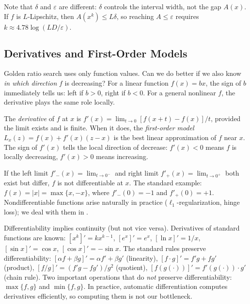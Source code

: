 Note that $\delta$ and $\varepsilon$ are different: $\delta$ controls the interval width, not the gap $A(x)$.
If $f$ is $L$-Lipschitz, then $A(x^k) \leq L\delta$, so reaching $A \leq \varepsilon$ requires $k \approx 4.78 \log(LD / \varepsilon)$.


\subsection{Derivatives and First-Order Models}\label{ssec:derivatives}

Golden ratio search uses only function values.
Can we do better if we also know \emph{in which direction} $f$ is decreasing?
For a linear function $f(x) = bx$, the sign of $b$ immediately tells us: left if $b > 0$, right if $b < 0$.
For a general nonlinear $f$, the derivative plays the same role locally.

\begin{defn}\label{def:derivative}
	The \textit{derivative} of $f$ at $x$ is $f'(x) = \lim_{t \to 0} [f(x + t) - f(x)] / t$, provided the limit exists and is finite.
	When it does, the \textit{first-order model} $L_x(z) = f(x) + f'(x)(z - x)$ is the best linear approximation of $f$ near $x$.
	The sign of $f'(x)$ tells the local direction of decrease: $f'(x) < 0$ means $f$ is locally decreasing, $f'(x) > 0$ means increasing.
\end{defn}

If the left limit $f'_-(x) = \lim_{t \to 0^-}$ and right limit $f'_+(x) = \lim_{t \to 0^+}$ both exist but differ, $f$ is not differentiable at $x$.
The standard example: $f(x) = |x| = \max\{x, -x\}$, where $f'_-(0) = -1$ and $f'_+(0) = +1$.
Nondifferentiable functions arise naturally in practice ($\ell_1$-regularization, hinge loss); we deal with them in .

Differentiability implies continuity (but not vice versa).
Derivatives of standard functions are known: $[x^k]' = kx^{k-1}$, $[e^x]' = e^x$, $[\ln x]' = 1/x$, $[\sin x]' = \cos x$, $[\cos x]' = -\sin x$.
The standard rules preserve differentiability:
$[\alpha f + \beta g]' = \alpha f' + \beta g'$ (linearity),
$[f \cdot g]' = f'g + fg'$ (product),
$[f/g]' = (f'g - fg')/g^2$ (quotient),
$[f(g(\cdot))]' = f'(g(\cdot)) \cdot g'$ (chain rule).
Two important operations that do \emph{not} preserve differentiability: $\max\{f, g\}$ and $\min\{f, g\}$.
In practice, automatic differentiation \cite{nocedal2006} computes derivatives efficiently, so computing them is not our bottleneck.

